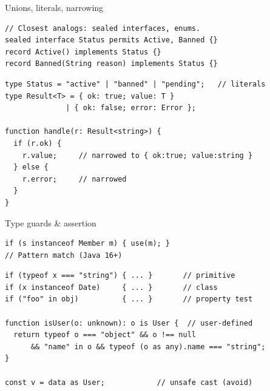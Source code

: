 \documentclass[10pt]{article}
\begin{document}
\begin{construct}{Unions, literals, narrowing}
\noindent
\begin{minipage}[t]{0.485\linewidth}
\begin{lstlisting}[style=java, title=Java]
// Closest analogs: sealed interfaces, enums.
sealed interface Status permits Active, Banned {}
record Active() implements Status {}
record Banned(String reason) implements Status {}
\end{lstlisting}
\end{minipage}\hfill
\begin{minipage}[t]{0.485\linewidth}
\begin{lstlisting}[style=ts, title=TypeScript]
type Status = "active" | "banned" | "pending";   // literals
type Result<T> = { ok: true; value: T }
              | { ok: false; error: Error };

function handle(r: Result<string>) {
  if (r.ok) {
    r.value;     // narrowed to { ok:true; value:string }
  } else {
    r.error;     // narrowed
  }
}
\end{lstlisting}
\end{minipage}
\end{construct}

\begin{construct}{Type guards \& assertion}
\noindent
\begin{minipage}[t]{0.485\linewidth}
\begin{lstlisting}[style=java, title=Java]
if (s instanceof Member m) { use(m); }
// Pattern match (Java 16+)
\end{lstlisting}
\end{minipage}\hfill
\begin{minipage}[t]{0.485\linewidth}
\begin{lstlisting}[style=ts, title=TypeScript]
if (typeof x === "string") { ... }       // primitive
if (x instanceof Date)     { ... }       // class
if ("foo" in obj)          { ... }       // property test

function isUser(o: unknown): o is User {  // user-defined
  return typeof o === "object" && o !== null
      && "name" in o && typeof (o as any).name === "string";
}

const v = data as User;            // unsafe cast (avoid)
\end{lstlisting}
\end{minipage}
\end{construct}

\end{document}
